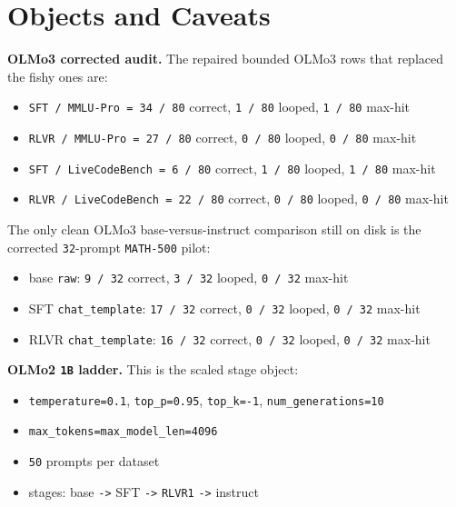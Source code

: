 \documentclass[11pt]{article}
\begin{document}
\section*{Objects and Caveats}
\textbf{OLMo3 corrected audit.}
The repaired bounded OLMo3 rows that replaced the fishy ones are:
\begin{itemize}[leftmargin=1.5em]
\item \texttt{SFT / MMLU-Pro = 34 / 80} correct, \texttt{1 / 80} looped, \texttt{1 / 80} max-hit
\item \texttt{RLVR / MMLU-Pro = 27 / 80} correct, \texttt{0 / 80} looped, \texttt{0 / 80} max-hit
\item \texttt{SFT / LiveCodeBench = 6 / 80} correct, \texttt{1 / 80} looped, \texttt{1 / 80} max-hit
\item \texttt{RLVR / LiveCodeBench = 22 / 80} correct, \texttt{0 / 80} looped, \texttt{0 / 80} max-hit
\end{itemize}
The only clean OLMo3 base-versus-instruct comparison still on disk is the corrected \texttt{32}-prompt \texttt{MATH-500} pilot:
\begin{itemize}[leftmargin=1.5em]
\item base \texttt{raw}: \texttt{9 / 32} correct, \texttt{3 / 32} looped, \texttt{0 / 32} max-hit
\item SFT \texttt{chat\_template}: \texttt{17 / 32} correct, \texttt{0 / 32} looped, \texttt{0 / 32} max-hit
\item RLVR \texttt{chat\_template}: \texttt{16 / 32} correct, \texttt{0 / 32} looped, \texttt{0 / 32} max-hit
\end{itemize}

\textbf{OLMo2 \texttt{1B} ladder.}
This is the scaled stage object:
\begin{itemize}[leftmargin=1.5em]
\item \texttt{temperature=0.1}, \texttt{top\_p=0.95}, \texttt{top\_k=-1}, \texttt{num\_generations=10}
\item \texttt{max\_tokens=max\_model\_len=4096}
\item \texttt{50} prompts per dataset
\item stages: base \texttt{->} SFT \texttt{->} \texttt{RLVR1} \texttt{->} instruct
\end{itemize}
\end{document}
